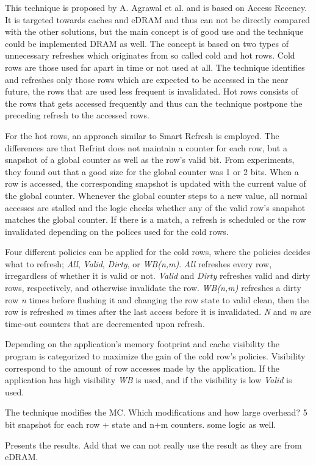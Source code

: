 This technique is proposed by A. Agrawal et al. \cite{refrint} and is based on Access Recency. It is targeted towards caches and eDRAM and thus can not be directly compared with the other solutions, but the main concept is of good use and the technique could be implemented DRAM as well. The concept is based on two types of unnecessary refreshes which originates from so called cold and hot rows. Cold rows are those used far apart in time or not used at all. The technique identifies and refreshes only those rows which are expected to be accessed in the near future, the rows that are used less frequent is invalidated. Hot rows consists of the rows that gets accessed frequently and thus can the technique postpone the preceding refresh to the accessed rows.

For the hot rows, an approach similar to Smart Refresh is employed. The differences are that Refrint does not maintain a counter for each row, but a snapshot of a global counter as well as the row's valid bit. From experiments, they found out that a good size for the global counter was 1 or 2 bits. When a row is accessed, the corresponding snapshot is updated with the current value of the global counter. Whenever the global counter steps to a new value, all normal accesses are stalled and the logic checks whether any of the valid row's snapshot  matches the global counter. If there is a match, a refresh is scheduled or the row invalidated depending on the polices used for the cold rows. 

Four different policies can be applied for the cold rows, where the policies decides what to refresh; \textit{All}, \textit{Valid}, \textit{Dirty}, or \textit{WB(n,m)}. \textit{All} refreshes every row, irregardless of whether it is valid or not. \textit{Valid} and \textit{Dirty} refreshes valid and dirty rows, respectively, and otherwise invalidate the row. \textit{WB(n,m)} refreshes a dirty row \textit{n} times before flushing it and changing the row state to valid clean, then the row is refreshed \textit{m} times after the last access before it is invalidated. \textit{N} and \textit{m} are time-out counters that are decremented upon refresh.


Depending on the application's memory footprint and cache visibility the program is categorized to maximize the gain of the cold row's policies. Visibility correspond to the amount of row accesses made by the application. If the application has high visibility \textit{WB} is used, and if the visibility is low \textit{Valid} is used. %

The technique modifies the MC. Which modifications and how large overhead? 5 bit snapshot for each row + state and n+m counters. some logic as well.

Presents the results. Add that we can not really use the result as they are from eDRAM.
